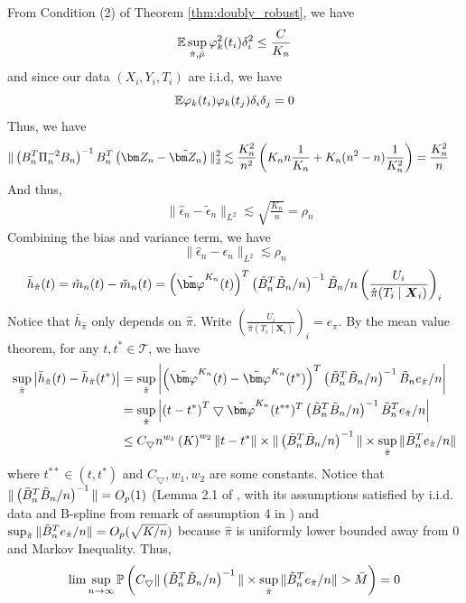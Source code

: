 From Condition (2) of Theorem \ref{thm:doubly_robust}, we have
$$
\mathbb{E} \sup_{\hat{\pi},\hat\mu}\varphi_k^2(t_i)\delta_i^2\leq \frac{C}{K_n}
$$
and since our data $(X_i,Y_i,T_i)$ are i.i.d, we have
$$
\mathbb{E}\varphi_k(t_i)\varphi_k(t_j)\delta_i\delta_j=0
$$
Thus, we have
\begin{equation*}
\begin{split}
&\|\left(B_n^T\Pi_n^{-2}B_n\right)^{-1}B_n^T\left(\Zn-\tilde\Zn\right)\|^2_2
\lesssim \frac{K_n^2}{n^2}\left(K_n n\frac{1}{K_n}+K_n(n^2-n)\frac{1}{K_n^2}\right)
=\frac{K_n^2}{n}
\end{split}
\end{equation*}
And thus,
\begin{equation*}
\begin{split}
&\|\hat\epsilon_n-\tilde\epsilon_n\|_{L^2}
\lesssim\sqrt{\frac{K_n}{n}}=\rho_n
\end{split}
\end{equation*}
Combining the bias and variance term, we have
$$
\|\hat\epsilon_n-\epsilon_n\|_{L^2}\lesssim \rho_n
$$
\[
\bar{h}_{\hat{\pi}}(t)=\hat{m}_n(t)-\tilde{m}_n(t)=\left(\tildevpk(t)\right)^{T}\left(\tbn^{T}\tbn/n\right)^{-1}\tbn/n\left(\frac{U_{i}}{\hat{\pi}(T_{i}\mid\boldsymbol{X}_{i})}\right)_{i}
\]
Notice that $\bar h_{\hat\pi}$ only depends on $\hat\pi$.
Write $\left(\frac{U_{i}}{\hat{\pi}(T_{i}\mid\boldsymbol{X}_{i})}\right)_{i}=e_{\hat{\pi}}$.
By the mean value theorem, for any $t,t^{*}\in\mathcal{T}$, we have
\begin{align*}
\sup_{\hat{\pi}}\left|\hpi(t)-\hpi(t^{*})\right| & =\sup_{\hat{\pi}}\left|\left(\tildevpk(t)-\tildevpk(t^{*})\right)^{T}\left(\tbn^{T}\tbn/n\right)^{-1}\tbn e_{\hat{\pi}}/n\right|\\
 & =\sup_{\hat{\pi}}\left|\left(t-t^{*}\right)^{T}\bigtriangledown\tildevpk(t^{**})^{T}\left(\tbn^{T}\tbn/n\right)^{-1}\tbn^{T}\epi/n\right|\\
 & \leq C_{\bigtriangledown}n^{w_{1}}\left(K\right)^{w_{2}}\|t-t^{*}\|\times\|\left(\tbn^{T}\tbn/n\right)^{-1}\|\times\sup_{\hat{\pi}}\|\tbn^{T}\epi/n\|
\end{align*}
where $t^{**}\in(t,t^{*})$ and $C_{\bigtriangledown},w_1,w_2$ are some constants.
Notice that $\|\left(\tilde{B}_n^{T}\tilde{B}_n/n\right)^{-1}\|=O_{p}(1)$ (Lemma 2.1 of \citep{chen2015optimal}, with its assumptions satisfied by i.i.d. data and B-spline from remark of assumption 4 in \citep{chen2015optimal}) and
$\sup_{\hat{\pi}}\|\tilde{B}_n^{T}e_{\hat{\pi}}/n\|=O_{p}(\sqrt{K/n})$ because
$\hat{\pi}$ is uniformly lower bounded away from 0 and Markov Inequality. Thus,
\[
\lim\sup_{n\rightarrow\infty}\P\left(C_{\bigtriangledown}\|\left(\tbn^{T}\tbn/n\right)^{-1}\|\times\sup_{\hat{\pi}}\|\tbn^{T}\epi/n\|>\bar{M}\right)=0
\]
